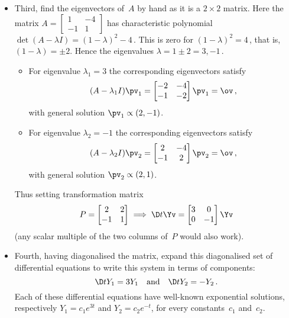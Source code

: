\begin{itemize}
\item Third, find the eigenvectors of~\(A\) by hand as it is a \(2\times2\) matrix. 
Here the matrix \(A=\begin{bmatrix} 1&-4\\-1&1 \end{bmatrix}\) has characteristic polynomial \(\det(A-\lambda I)=(1-\lambda)^2-4\)\,.
This is zero for \((1-\lambda)^2=4\)\,, that is, \((1-\lambda)=\pm2\).
Hence the eigenvalues \(\lambda=1\pm2=3,-1\)\,.
\begin{itemize}
\item For eigenvalue \(\lambda_1=3\) the corresponding eigenvectors satisfy
\begin{equation*}
(A-\lambda_1I)\pv_1=\begin{bmatrix} -2&-4\\-1&-2 \end{bmatrix}\pv_1=\ov\,,
\end{equation*}
with general solution \(\pv_1\propto(2,-1)\).

\item For eigenvalue \(\lambda_2=-1\) the corresponding eigenvectors satisfy
\begin{equation*}
(A-\lambda_2I)\pv_2=\begin{bmatrix} 2&-4\\-1&2 \end{bmatrix}\pv_2=\ov\,,
\end{equation*}
with general solution \(\pv_2\propto(2,1)\).
\end{itemize}
Thus setting transformation matrix 
\begin{equation*}
P=\begin{bmatrix} 2&2\\-1&1 \end{bmatrix}
\implies \D t\Yv=\begin{bmatrix} 3&0\\0&-1 \end{bmatrix}\Yv
\end{equation*}
(any scalar multiple of the two columns of~\(P\) would also work).

\item Fourth, having diagonalised the matrix, expand this diagonalised set of differential equations to write this system in terms of components: 
\begin{equation*}
\D t{Y_1}=3Y_1 \quad\text{and}\quad \D t{Y_2}=-Y_2\,.
\end{equation*}
Each of these differential equations have well-known exponential solutions, respectively \(Y_1=c_1e^{3t}\) and \(Y_2=c_2e^{-t}\),  for every constants~\(c_1\) and~\(c_2\).


\end{itemize}
